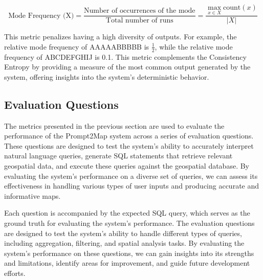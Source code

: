 \begin{equation}
    \text{Mode Frequency (X)} = \frac{\text{Number of occurrences of the mode}}{\text{Total number of runs}} = \frac{\max_{x \in X} \text{count}(x)}{|X|}
    \label{eq:mode_frequency}
\end{equation}


This metric penalizes having a high diversity of outputs. For example, the relative mode frequency of AAAAABBBBB is $\frac{1}{2}$, while the relative mode frequency of ABCDEFGHIJ is 0.1. This metric complements the Consistency Entropy by providing a measure of the most common output generated by the system, offering insights into the system's deterministic behavior.


\subsection{Evaluation Questions}

The metrics presented in the previous section are used to evaluate the performance of the Prompt2Map system across a series of evaluation questions. These questions are designed to test the system's ability to accurately interpret natural language queries, generate SQL statements that retrieve relevant geospatial data, and execute these queries against the geospatial database. By evaluating the system's performance on a diverse set of queries, we can assess its effectiveness in handling various types of user inputs and producing accurate and informative maps.

Each question is accompanied by the expected SQL query, which serves as the ground truth for evaluating the system's performance. The evaluation questions are designed to test the system's ability to handle different types of queries, including aggregation, filtering, and spatial analysis tasks. By evaluating the system's performance on these questions, we can gain insights into its strengths and limitations, identify areas for improvement, and guide future development efforts.

